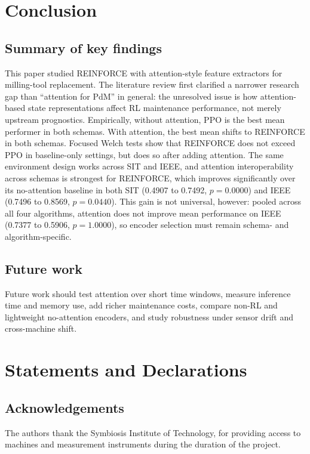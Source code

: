 \documentclass[sn-basic]{sn-jnl}%
\begin{document}
\section{Conclusion} \label{sec:conclusion} %

\subsection{Summary of key findings}
This paper studied \textsc{REINFORCE} with attention-style feature extractors for milling-tool replacement. The literature review first clarified a narrower research gap than ``attention for PdM'' in general: the unresolved issue is how attention-based state representations affect RL maintenance performance, not merely upstream prognostics. Empirically, without attention, \textsc{PPO} is the best mean performer in both schemas. With attention, the best mean shifts to \textsc{REINFORCE} in both schemas. Focused Welch tests show that \textsc{REINFORCE} does not exceed \textsc{PPO} in baseline-only settings, but does so after adding attention. The same environment design works across SIT and IEEE, and attention interoperability across schemas is strongest for \textsc{REINFORCE}, which improves significantly over its no-attention baseline in both SIT (0.4907 to 0.7492, $p=0.0000$) and IEEE (0.7496 to 0.8569, $p=0.0440$). This gain is not universal, however: pooled across all four algorithms, attention does not improve mean performance on IEEE (0.7377 to 0.5906, $p=1.0000$), so encoder selection must remain schema- and algorithm-specific.

\subsection{Future work}
Future work should test attention over short time windows, measure inference time and memory use, add richer maintenance costs, compare non-RL and lightweight no-attention encoders, and study robustness under sensor drift and cross-machine shift.

\section*{Statements and Declarations}

\subsection*{Acknowledgements}
The authors thank the Symbiosis Institute of Technology, for providing access to machines and measurement instruments during the duration of the project.
\end{document}
